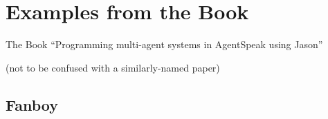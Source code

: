 \documentclass[presentation]{beamer}\mode<presentation>{\usetheme{AMSBolognaFC}}
\begin{document}
\section[Examples from the \jason{} Book]{Examples from the \jason{} Book}

\begin{frame}{The \jason{} Book}
    \centering
    ``Programming multi-agent systems in AgentSpeak using Jason''
    \cite{bordini2007programming}

    \medskip
    
    (not to be confused with a similarly-named paper)

\end{frame}

\subsection{Fanboy}

\end{document}
